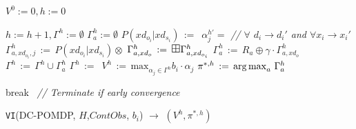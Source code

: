 \documentclass{article} %
\def\argmax{\operatornamewithlimits{arg\max}}
\begin{document}
\incmargin{.5em}
\linesnumbered
\begin{algorithm}[t!]
\vspace{-.5mm}
\dontprintsemicolon
{}
\Begin
{
   $V^0:=0, h:=0$\;
   {
       $h:=h+1, \Gamma^h :=\emptyset$\;
       {
			$\Gamma_{a}^h :=\emptyset$ \;       		
       			{$P(xd_{o_i}|xd_{s_i}) \,:=\,$ \;}
       		 {
       			{
   	 		  		$\alpha_j^{h'}=$  \;
   	 		  		\emph{// $\forall$ $d_i \to d_i'$ and $\forall x_i \to x_i'$} \; 
   	 		    	$\Gamma_{a,xd_{o_i},j}^h \,:=\, P(xd_{o_i}|xd_{s_i}) \otimes$ \;
       	      	}
       	      	$\Gamma_{a,xd_o}^h\,:=\,\textrm{\large $\boxplus$} \Gamma_{a,xd_{o_i}}^h$\;
       	     }
           $\Gamma_a^{h} \,:=\,R_a \oplus \gamma \cdot \Gamma_{a,xd_o}^h$\;
            $\Gamma^{h} \,:=\, \Gamma^{h} \cup \Gamma_a^{h}$\;
        }  
              $\Gamma^h \,:=\, $ \;
              $V^h \,:=\, \mathrm{max}_{\alpha_j \in \Gamma^h} b_i \cdot \alpha_j$\;
              $\pi^{*,h} \,:=\, \argmax_{a} \, \Gamma_a^{h}$\;

           {break $\,$ \emph{// Terminate if early convergence}\;}
   }
      \;
}
\caption{\footnotesize \texttt{VI}(DC-POMDP, $H$,$ContObs$, $b_i$) $\longrightarrow$ $(V^h,\pi^{*,h})$ \label{alg:vi}}
\vspace{-1mm}
\end{algorithm}
\decmargin{.5em}

\end{document}
